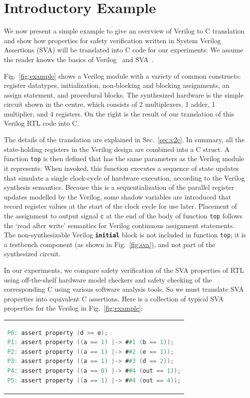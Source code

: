 \section{Introductory Example} 

We now present a simple example to give an overview of Verilog to C translation and show how properties for safety verification written in System Verilog Assertions (SVA) will be translated into C code for our experiments. We assume the reader knows the basics of Verilog~\cite{verilog} and SVA~\cite{sva_ref}. 

Fig.\ \ref{fig:example} shows a Verilog module with a variety of common constructs: register datatypes, initialization, non-blocking and blocking assignments, an assign statement, and procedural blocks.  The synthesized hardware is the simple circuit shown in the centre, which consists of 2 multiplexers, 1 adder, 1 multiplier, and 4 registers.  On the right is the result of our translation of this Verilog RTL code into C.

The details of the translation are explained in Sec.\ \ref{sec:v2c}. In summary, all the state-holding registers in the Verilog design are combined into a C struct. A function \texttt{top} is then defined that has the same parameters as the Verilog module it represents. When invoked, this function executes a sequence of state updates that simulate a single clock-cycle of hardware execution, according to the Verilog synthesis semantics. Because this is a sequentialization of the parallel register updates modelled by the Verilog, some shadow variables are introduced that record register values at the start of the clock cycle for use later.  Placement of the assignment to output signal \texttt{c} at the end of the body of function \texttt{top} follows the `read after write' semantics for Verilog continuous assignment statements.  
The non-synthesizable Verilog {\bf\texttt{initial}} block is not included in function \texttt{top}; it is a testbench component (as shown in Fig.\ \ref{fig:sva}), and not part of the synthesized circuit.   

In our experiments, we compare safety verification of the SVA properties of RTL using 
off-the-shelf hardware model checkers and safety checking of the corresponding C using 
various software analysis tools.  So we must translate SVA properties into equivalent C 
assertions. Here is a collection of typical SVA properties for the Verilog in Fig.\ \ref{fig:example}:

\begin{center}
\begin{tabular}[t]{@{}l@{}}
\begin{lstlisting}[mathescape=true,language=Verilog,basicstyle=\scriptsize\ttfamily]
P0: assert property (d >= e);
P1: assert property ((a == 1) |-> ##1 (b == 1));
P2: assert property ((a == 1) |-> ##2 (e == 1));
P3: assert property ((a == 1) |-> ##3 (d == 2));
P4: assert property ((a == 0) |-> ##4 (out == 1));
P5: assert property ((a == 1) |-> ##4 (out == 4));
\end{lstlisting}
\end{tabular}
\end{center}

